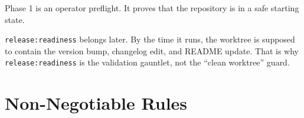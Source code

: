 Phase 1 is an operator preflight. It proves that the repository is in a safe starting state.

\texttt{r\allowbreak{}e\allowbreak{}l\allowbreak{}e\allowbreak{}a\allowbreak{}s\allowbreak{}e\allowbreak{}:\allowbreak{}r\allowbreak{}e\allowbreak{}a\allowbreak{}d\allowbreak{}i\allowbreak{}n\allowbreak{}e\allowbreak{}s\allowbreak{}s} belongs later. By the time it runs, the worktree is supposed to contain the version bump, changelog edit, and README update. That is why \texttt{r\allowbreak{}e\allowbreak{}l\allowbreak{}e\allowbreak{}a\allowbreak{}s\allowbreak{}e\allowbreak{}:\allowbreak{}r\allowbreak{}e\allowbreak{}a\allowbreak{}d\allowbreak{}i\allowbreak{}n\allowbreak{}e\allowbreak{}s\allowbreak{}s} is the validation gauntlet, not the ``clean worktree'' guard.

\section{Non-Negotiable Rules}\label{record-274-non-negotiable-rules}

